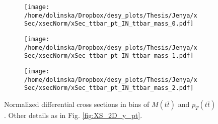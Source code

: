 \begin{figure}[H]
\centering
\begin{subfigure}
  \centering
  \texttt{[image: /home/dolinska/Dropbox/desy\_plots/Thesis/Jenya/xSec/xsecNorm/xSec\_ttbar\_pt\_IN\_ttbar\_mass\_0.pdf]}
\end{subfigure}
\begin{subfigure}
  \centering
  \texttt{[image: /home/dolinska/Dropbox/desy\_plots/Thesis/Jenya/xSec/xsecNorm/xSec\_ttbar\_pt\_IN\_ttbar\_mass\_1.pdf]}
\end{subfigure}
\begin{subfigure}
  \centering
  \texttt{[image: /home/dolinska/Dropbox/desy\_plots/Thesis/Jenya/xSec/xsecNorm/xSec\_ttbar\_pt\_IN\_ttbar\_mass\_2.pdf]}
\end{subfigure}
\caption{Normalized differential cross sections in bins of $M(t\bar{t})$ and $p_{T}(t\bar{t})$. Other details as in Fig. \ref{fig:XS_2D_y_pt}.}
\label{fig:XS_2D_Mtt_pttt}
\end{figure}

